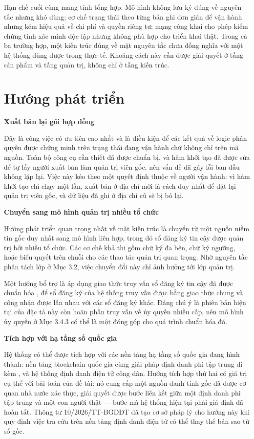 Hạn chế cuối cùng mang tính tổng hợp. Mô hình không lưu ký đúng về nguyên tắc nhưng khó dùng; cơ chế trạng thái theo từng bản ghi đơn giản để vận hành nhưng kém hiệu quả về chi phí và quyền riêng tư; mạng công khai cho phép kiểm chứng tính xác minh độc lập nhưng không phù hợp cho triển khai thật. Trong cả ba trường hợp, một kiến trúc đúng về mặt nguyên tắc chưa đồng nghĩa với một hệ thống dùng được trong thực tế. Khoảng cách này cần được giải quyết ở tầng sản phẩm và tầng quản trị, không chỉ ở tầng kiến trúc.

\section{Hướng phát triển}

\noindent \textbf{Xuất bản lại gói hợp đồng}

Đây là công việc có ưu tiên cao nhất và là điều kiện để các kết quả về logic phân quyền được chứng minh trên trạng thái đang vận hành chứ không chỉ trên mã nguồn. Toàn bộ công cụ cần thiết đã được chuẩn bị, và hàm khởi tạo đã được sửa để tự lấy người xuất bản làm quản trị viên gốc, nên vấn đề đã gây lỗi ban đầu không lặp lại. Việc này kéo theo một quyết định thuộc về người vận hành: vì hàm khởi tạo chỉ chạy một lần, xuất bản ở địa chỉ mới là cách duy nhất để đặt lại quản trị viên gốc, và dữ liệu đã ghi ở địa chỉ cũ sẽ bị bỏ lại.

\noindent \textbf{Chuyển sang mô hình quản trị nhiều tổ chức}

Hướng phát triển quan trọng nhất về mặt kiến trúc là chuyển từ một nguồn niềm tin gốc duy nhất sang mô hình liên hợp, trong đó sổ đăng ký tin cậy được quản trị bởi nhiều tổ chức. Các cơ chế khả thi gồm chữ ký đa bên, chữ ký ngưỡng, hoặc biểu quyết trên chuỗi cho các thao tác quản trị quan trọng. Nhờ nguyên tắc phân tách lớp ở Mục 3.2, việc chuyển đổi này chỉ ảnh hưởng tới lớp quản trị.

Một hướng bổ trợ là áp dụng giao thức truy vấn sổ đăng ký tin cậy đã được chuẩn hóa \cite{ToIP_TRQP2026}, để sổ đăng ký của hệ thống truy vấn được bằng giao thức chung và công nhận được lẫn nhau với các sổ đăng ký khác. Đáng chú ý là phiên bản hiện tại của đặc tả này còn hoãn phần truy vấn về ủy quyền nhiều cấp, nên mô hình ủy quyền ở Mục 3.4.3 có thể là một đóng góp cho quá trình chuẩn hóa đó.

\noindent \textbf{Tích hợp với hạ tầng số quốc gia}

Hệ thống có thể được tích hợp với các nền tảng hạ tầng số quốc gia đang hình thành: nền tảng blockchain quốc gia cùng giải pháp định danh phi tập trung đi kèm \cite{NDAChain2025}, và hệ thống định danh điện tử công dân. Hướng tích hợp thứ hai có giá trị cụ thể với bài toán của đề tài: nó cung cấp một nguồn danh tính gốc đã được cơ quan nhà nước xác thực, giải quyết được bước liên kết giữa một định danh phi tập trung và một con người thật --- bước mà hệ thống hiện tại phải giả định đã hoàn tất. Thông tư 10/2026/TT-BGDĐT \cite{TT10_2026} đã tạo cơ sở pháp lý cho hướng này khi quy định việc tra cứu trên nền tảng định danh điện tử có thể thay thế bản sao từ sổ gốc.

